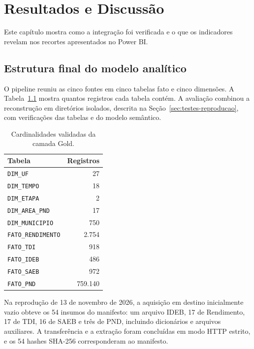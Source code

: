 \chapter[Resultados e Discussão]{Resultados e Discussão}
\label{cap:resultados}

Este capítulo mostra como a integração foi verificada e o que os indicadores revelam nos recortes apresentados no Power BI.

\section{Estrutura final do modelo analítico}
\label{sec:resultados-tecnicos}

O pipeline reuniu as cinco fontes em cinco tabelas fato e cinco dimensões. A Tabela~\ref{tab:cardinalidades-gold} mostra quantos registros cada tabela contém. A avaliação combinou a reconstrução em diretórios isolados, descrita na Seção~\ref{sec:testes-reproducao}, com verificações das tabelas e do modelo semântico.

\begin{table}[H]
\centering
\caption{Cardinalidades validadas da camada Gold.}
\label{tab:cardinalidades-gold}
\begin{tabular}{|l|r|}
\hline
\textbf{Tabela} & \textbf{Registros} \\ \hline
\texttt{DIM\_UF} & 27 \\ \hline
\texttt{DIM\_TEMPO} & 18 \\ \hline
\texttt{DIM\_ETAPA} & 2 \\ \hline
\texttt{DIM\_AREA\_PND} & 17 \\ \hline
\texttt{DIM\_MUNICIPIO} & 750 \\ \hline
\texttt{FATO\_RENDIMENTO} & 2.754 \\ \hline
\texttt{FATO\_TDI} & 918 \\ \hline
\texttt{FATO\_IDEB} & 486 \\ \hline
\texttt{FATO\_SAEB} & 972 \\ \hline
\texttt{FATO\_PND} & 759.140 \\ \hline
\end{tabular}
\end{table}

Na reprodução de 13 de novembro de 2026, a aquisição em destino inicialmente vazio obteve os 54 insumos do manifesto: um arquivo IDEB, 17 de Rendimento, 17 de TDI, 16 de SAEB e três de PND, incluindo dicionários e arquivos auxiliares. A transferência e a extração foram concluídas em modo HTTP estrito, e os 54 hashes SHA-256 corresponderam ao manifesto.

